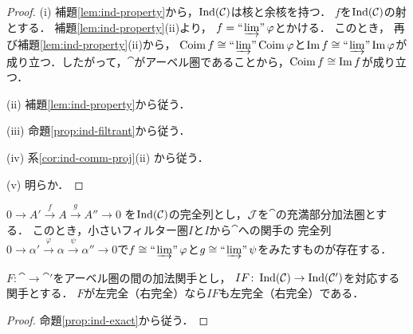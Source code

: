 \begin{proof}
    (i) 
    補題\ref{lem:ind-property}から，$\mathop{\mathrm{Ind}}(\mathcal{C})$は核と余核を持つ．
    $f$を$\mathop{\mathrm{Ind}}(\mathcal{C})$の射とする．
    補題\ref{lem:ind-property}(ii)より，
    $f=\mathop{\text{``}\hspace{-0.7pt}\varinjlim\hspace{-1.5pt}\text{''}}\varphi$とかける．
    このとき，
    再び補題\ref{lem:ind-property}(ii)から，
    $\mathop{\mathrm{Coim}}\nolimits f\cong\mathop{\text{``}\hspace{-0.7pt}\varinjlim\hspace{-1.5pt}\text{''}}\mathop{\mathrm{Coim}}\nolimits\varphi$と$\mathop{\mathrm{Im}}\nolimits f\cong\mathop{\text{``}\hspace{-0.7pt}\varinjlim\hspace{-1.5pt}\text{''}}\mathop{\mathrm{Im}}\nolimits\varphi$が
    成り立つ．したがって，$\cat$がアーベル圏であることから，$\mathop{\mathrm{Coim}}\nolimits f\cong\mathop{\mathrm{Im}}\nolimits f$が成り立つ．

    (ii) 
    補題\ref{lem:ind-property}から従う．

    (iii) 
    命題\ref{prop:ind-filtrant}から従う．

    (iv) 
    系\ref{cor:ind-comm-proj}(ii) から従う．

    (v) 
    明らか．
\end{proof}


\begin{Proposition}\label{prop:ind-exact}
    $0\to A'\overset{f}{\to}A\overset{g}{\to}A''\to 0$
    を$\mathop{\mathrm{Ind}}(\mathcal{C})$の完全列とし，$\mathcal{J}$を$\cat$の充満部分加法圏とする．
    このとき，小さいフィルター圏$I$と$I$から$\cat$への関手の
    完全列$0\to \alpha'
    \overset{\varphi}{\to}\alpha
    \overset{\psi}{\to}\alpha''\to 0$で$f\cong\mathop{\text{``}\hspace{-0.7pt}\varinjlim\hspace{-1.5pt}\text{''}}\varphi$と$g\cong\mathop{\text{``}\hspace{-0.7pt}\varinjlim\hspace{-1.5pt}\text{''}}\psi$をみたすものが存在する．
\end{Proposition}

\begin{comment}
\begin{Lemma}
    $I$を小さいフィルター圏，
    $\alpha\colon T\to \cat$を関手，
    $A=\limf\alpha$とし，
    $f\colon A\hookrightarrow B$を$\Ind(\cat)$における単射とする．
    このとき，小さいフィルター圏$K$と共終関手$p$
\end{Lemma}
\end{comment}

\begin{Corollary}
    $F\colon \cat\to\cat'$をアーベル圏の間の加法関手とし，
    $IF\colon\mathop{\mathrm{Ind}}(\mathcal{C})\to\mathop{\mathrm{Ind}}(\mathcal{C}')$を対応する関手とする．
    $F$が左完全（右完全）なら$IF$も左完全（右完全）である．
\end{Corollary}

\begin{proof}
    命題\ref{prop:ind-exact}から従う．
\end{proof}




























